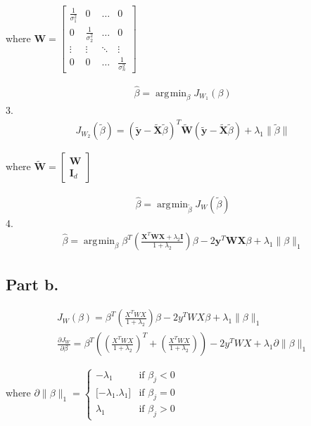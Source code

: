 \documentclass[12pt]{article}
\DeclareMathOperator*{\argmin}{arg\!\min}
\begin{document}
\begin{center}
where $\textbf{W} = 
\begin{bmatrix}
\frac{1}{\sigma^2_1} & 0 & \dots & 0 \\
0 & \frac{1}{\sigma^2_2} & \dots & 0 \\
\vdots & \vdots & \ddots & \vdots \\
0 & 0 & \dots & \frac{1}{\sigma^2_n}
\end{bmatrix}$
\end{center}
\begin{align*}
\hat{\beta} = \argmin_{\beta} J_{W_1}(\beta)
\end{align*}
3. 
\begin{align*}
J_{W_2}(\widetilde{\beta}) = (\widetilde{\textbf{y}} - \widetilde{\textbf{X}}\widetilde{\beta})^T \widetilde{\textbf{W}} (\widetilde{\textbf{y}} - \widetilde{\textbf{X}}\widetilde{\beta})+ \lambda_1\|\widetilde{\beta}\|
\end{align*}
\begin{center}
where $\widetilde{\textbf{W}} = 
\begin{bmatrix}
\textbf{W} \\
\textbf{I}_d
\end{bmatrix}$
\end{center}
\begin{align*}
\hat{\beta} = \argmin_{\widetilde{\beta}} J_W(\widetilde{\beta})
\end{align*}
4. 
\begin{align*}
\hat{\beta} = \argmin_\beta \beta^T \left( \frac{\textbf{X}^T\textbf{W}\textbf{X} + \lambda_2 \textbf{I}}{1 + \lambda_2} \right) \beta - 2\textbf{y}^T \textbf{W}\textbf{X} \beta + \lambda_1 \|\beta\|_1
\end{align*}

\subsection*{Part b.}
\begin{align*}
J_{W}(\beta) = \beta^T\left( \frac{X^TWX}{1+\lambda_2} \right) \beta - 2y^TWX\beta + \lambda_1 \|\beta\|_1 \\
\frac{\partial{J_W}}{\partial{\beta}} = \beta^T\left(\left( \frac{X^TWX}{1+\lambda_2} \right)^T + \left( \frac{X^TWX}{1+\lambda_2} \right)\right) - 2y^TWX + \lambda_1\partial{\|\beta\|_1}
\end{align*}
\begin{center}
where $\partial{\|\beta\|_1} = 
\begin{cases}
-\lambda_1 & \mbox{if } \beta_j < 0 \\
\lbrack -\lambda_1. \lambda_1 \rbrack & \mbox{if } \beta_j = 0 \\
\lambda_1 & \mbox{if } \beta_j > 0
\end{cases}$
\end{center}
\end{document}
